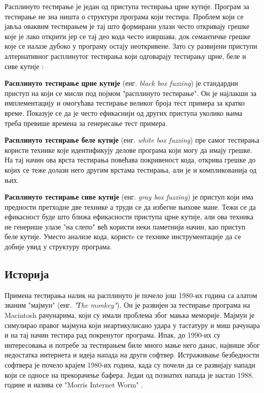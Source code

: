 \documentclass[12pt,oneside]{memoir}
\begin{document}
Расплинуто тестирање је један од приступа тестирања црне кутије. Програм за тестирање не зна ништа о структури програма који тестира. Проблем који се јавља оваквим тестирањем је тај што формирани улази често откривају грешке које је лако открити јер се тај део кода често извршава,  док семантичке грешке које се налазе дубоко у програму остају неоткривене. Зато су развијени приступи алтернативног расплинутог тестирања који одговарају тестирању црне, беле и сиве кутије \cite{fuzzing, grayBoxFuzzing, whiteBoxFuzzing}:
\begin{description}
\item\textbf{Расплинуто тестирање црне кутије} (енг. \textit{black box fuzzing}) је стандардни приступ на који се мисли под појмом "расплинуто тестирање". Он је најлакши за имплементацију и омогућава тестирање великог броја тест примера за кратко време. Показује се да је често ефикаснији од других приступа уколико њима треба превише времена за генерисање тест примера.
\item\textbf{Расплинуто тестирање беле кутије} (енг. \textit{white box fuzzing}) пре самог тестирања користи технике које идентификују делове програма који могу да имају грешке. На тај начин ова врста тестирања повећава покривеност кода, открива грешке до којих се теже долази него другим врстама тестирања, али је и компликованија од њих. 
\item\textbf{Расплинуто тестирање сиве кутије} (енг. \textit{gray box fuzzing}) је приступ који има предности претходне две технике а труди се да избегне њихове мане. Тежи се да ефикасност буде што ближа ефикасности приступа црне кутије, али ова техника не генерише улазе "на слепо" већ користи неки паметнији начин, као приступ беле кутије. Уместо анализе кода, користe се технике инструментације да се добије увид у структуру програма.
\end{description}

\subsection{Историја}
\label{subsec:history}

Примена тестирања налик на расплинуто је почело још 1980-их година са алатом званим "мајмун" (енг. \textit{"Тhe monkey"}). Он је развијен за тестирање програма на Macintosh рачунарима, који су имали проблема због мањка меморије. Мајмун је симулирао правог мајмуна који неартикулисано удара у тастатуру и миш рачунара и на тај начин тестира рад покренутог програма. Ипак, до 1990-их су интересовања и потребе за тестирањем биле много мање него данас, највише због недостатка интернета и идеја напада на други софтвер. Истраживање безбедности софтвера је почело крајем 1980-их година, када су почели да се развијају напади који се односе на прекорачење бафера. Један од познатих напада је настао 1988. године и назива се "Morris Internet Worm" \cite{fuzzingBrute, fuzzing}. 
\end{document}
